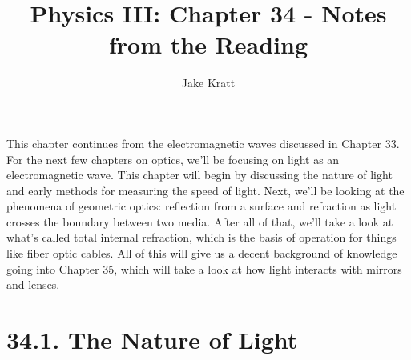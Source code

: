 \documentclass[12pt, letterpaper]{article}
\title{Physics III: Chapter 34 - Notes from the Reading}
\author{Jake Kratt}
\begin{document}
\maketitle

This chapter continues from the electromagnetic waves discussed in Chapter 33. For the next few chapters on optics, we'll be focusing on light as an electromagnetic wave. This chapter will begin by discussing the nature of light and early methods for measuring the speed of light. Next, we'll be looking at the phenomena of geometric optics: reflection from a surface and refraction as light crosses the boundary between two media. After all of that, we'll take a look at what's called total internal refraction, which is the basis of operation for things like fiber optic cables. All of this will give us a decent background of knowledge going into Chapter 35, which will take a look at how light interacts with mirrors and lenses.

\section*{34.1. The Nature of Light}
\end{document}
